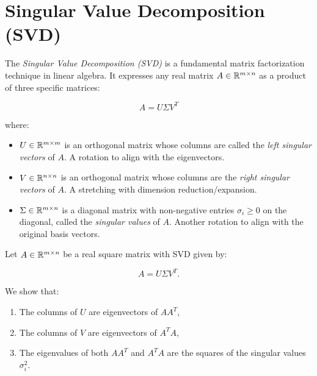 \section{Singular Value Decomposition (SVD)}

The \emph{Singular Value Decomposition (SVD)} is a fundamental matrix factorization technique in linear 
algebra. It expresses any real matrix \( A \in \mathbb{R}^{m \times n} \) as a product of three specific 
matrices:

\[
    A = U \Sigma V^T
\]

where:

\begin{itemize}

    \item \( U \in \mathbb{R}^{m \times m} \) is an orthogonal matrix whose columns are called the 
          \emph{left singular vectors} of \( A \). A rotation to align with the eigenvectors.

    \item \( V \in \mathbb{R}^{n \times n} \) is an orthogonal matrix whose columns are the 
          \emph{right singular vectors} of \( A \). A stretching with dimension reduction/expansion.

    \item \( \Sigma \in \mathbb{R}^{m \times n} \) is a diagonal matrix with non-negative entries 
          \( \sigma_i \geq 0 \) on the diagonal, called the \emph{singular values} of \( A \). Another rotation to align with the original 
          basis vectors.

\end{itemize}

Let \( A \in \mathbb{R}^{m \times n} \) be a real square matrix with SVD given by:

\[
    A = U \Sigma V^T.
\]

We show that:

\begin{enumerate}

    \item The columns of \( U \) are eigenvectors of \( AA^T \),

    \item The columns of \( V \) are eigenvectors of \( A^T A \),

    \item The eigenvalues of both \( AA^T \) and \( A^T A \) are the squares of the singular values \( \sigma_i^2 \).

\end{enumerate}

